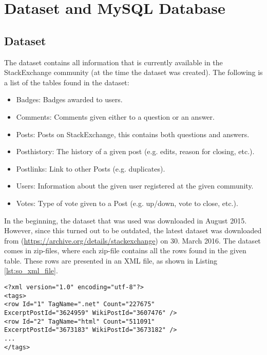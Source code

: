\label{chap:chapter3}

\section{Dataset and MySQL Database}
\label{sec:dataset_db}

\subsection{Dataset}
The dataset contains all information that is currently available in the StackExchange community 
(at the time the dataset was created). The following is a list of the tables found in the dataset:
\begin{itemize}
	\item Badges: Badges awarded to users.
	\item Comments: Comments given either to a question or an answer.
	\item Posts: Posts on StackExchange, this contains both questions and answers.
	\item Posthistory: The history of a given post (e.g. edits, reason for closing, etc.).
	\item Postlinks: Link to other Posts (e.g. duplicates).
	\item Users: Information about the given user registered at the given community.
	\item Votes: Type of vote given to a Post (e.g. up/down, vote to close, etc.).
\end{itemize}
In the beginning, the dataset that was used was downloaded in August 2015. However, since this turned out 
to be outdated, the latest dataset was downloaded from (\url{https://archive.org/details/stackexchange}) on 
30. March 2016. The dataset comes in zip-files, where each zip-file contains all the rows found in the given 
 table. These rows are presented in an XML file, as shown in Listing \ref{lst:so_xml_file}.
\begin{lstlisting}[caption={Content in stackoverflow.com-Tags.xml}, label={lst:so_xml_file}] 
<?xml version="1.0" encoding="utf-8"?>
<tags>
<row Id="1" TagName=".net" Count="227675" 
ExcerptPostId="3624959" WikiPostId="3607476" />
<row Id="2" TagName="html" Count="511091" 
ExcerptPostId="3673183" WikiPostId="3673182" />
...
</tags>
\end{lstlisting}

